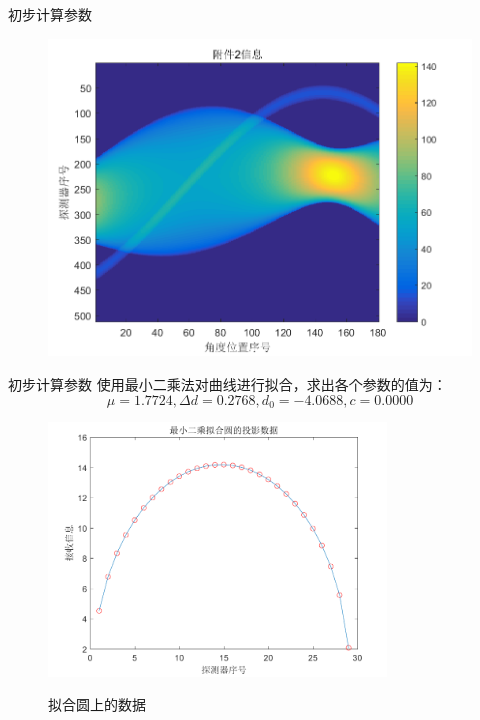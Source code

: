 \documentclass{beamer} %
\begin{document}
\begin{frame}{初步计算参数}
\begin{figure}[H]
\begin{minipage}[H]{0.45\textwidth}
		\centering
		\includegraphics[width=\textwidth]{./pic/fujian2.png}
		\end{minipage}
	\end{figure}
\end{frame}

\begin{frame}{初步计算参数}
	\small 使用最小二乘法对曲线进行拟合，求出各个参数的值为：
	\[\mu =1.7724 , \Delta d = 0.2768, d_0 = -4.0688, c = 0.0000\]
	\begin{figure}[H]
		\centering
		\includegraphics[width=0.8\textwidth]{./pic/fitCir.png}\\
		\caption{拟合圆上的数据}
	  \end{figure}
\end{frame}
\end{document}
